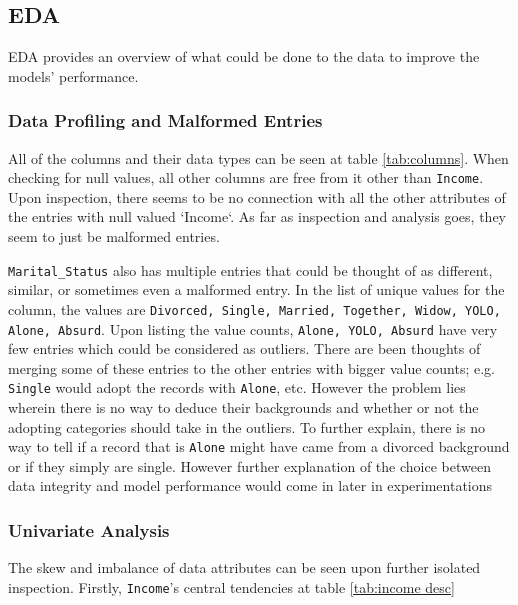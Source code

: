 \subsection{EDA}

EDA provides an overview of what could be done to the data to improve the models' performance. 

\subsubsection{Data Profiling and Malformed Entries}

All of the columns and their data types can be seen at table \ref{tab:columns}. When checking for null values, all other columns are free from it other than \texttt{Income}. Upon inspection, there seems to be no connection with all the other attributes of the entries with null valued `Income`. As far as inspection and analysis goes, they seem to just be malformed entries. 

\texttt{Marital\_Status} also has multiple entries that could be thought of as different, similar, or sometimes even a malformed entry. In the list of unique values for the column, the values are \texttt{Divorced, Single, Married, Together, Widow, YOLO, Alone, Absurd}. Upon listing the value counts, \texttt{Alone, YOLO, Absurd} have very few entries which could be considered as outliers. There are been thoughts of merging some of these entries to the other entries with bigger value counts; e.g. \texttt{Single} would adopt the records with \texttt{Alone}, etc. However the problem lies wherein there is no way to deduce their backgrounds and whether or not the adopting categories should take in the outliers. To further explain, there is no way to tell if a record that is \texttt{Alone} might have came from a divorced background or if they simply are single. However further explanation of the choice between data integrity and model performance would come in later in experimentations

\subsubsection{Univariate Analysis}

The skew and imbalance of data attributes can be seen upon further isolated inspection. Firstly, \texttt{Income}'s central tendencies at table \ref{tab:income desc}

